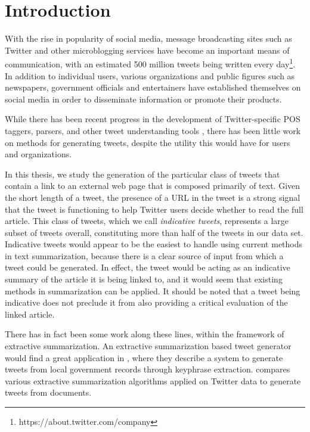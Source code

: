\chapter{Introduction}
\label{chap:intro}

With the rise in popularity of social media, message broadcasting sites such as Twitter and other microblogging services have become an important means of communication, with an estimated 500 million tweets being written every day\footnote{https://about.twitter.com/company}. In addition to individual users, various organizations and public figures such as newspapers, government officials and entertainers have established themselves on social media in order to disseminate information or promote their products. 

While there has been recent progress in the development of Twitter-specific POS taggers, parsers, and other tweet understanding tools \cite{owoputi-etal-2013,kong-etal-2014}, there has been little work on methods for generating tweets, despite the utility this would have for users and organizations. 

In this thesis, we study the generation of the particular class of tweets that contain a link to an external web page that is composed primarily of text. Given the short length of a tweet, the presence of a URL in the tweet is a strong signal that the tweet is functioning to help Twitter users decide whether to read the full article. This class of tweets, which we call \emph{indicative tweets}, represents a large subset of tweets overall, constituting more than half of the tweets in our data set. Indicative tweets would appear to be the easiest to handle using current methods in text summarization, because there is a clear source of input from which a tweet could be generated. In effect, the tweet would be acting as an indicative summary of the article it is being linked to, and it would seem that existing methods in summarization can be applied. It should be noted that a tweet being indicative does not preclude it from also providing a critical evaluation of the linked article.

There has in fact been some work along these lines, within the framework of extractive summarization. An extractive summarization based tweet generator would find a great application in \cite{lofi2012iparticipate}, where they describe a system to generate tweets from local government records through keyphrase extraction. \cite{lloret2013towards} compares various extractive summarization algorithms applied on Twitter data to generate tweets from documents. 

